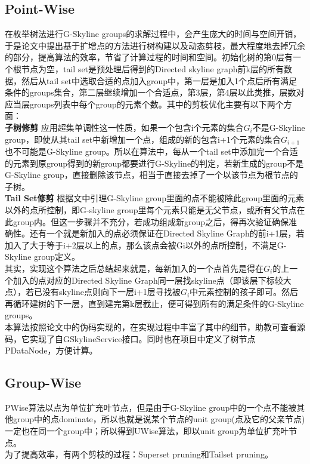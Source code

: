\documentclass{article}
\begin{document}
\begin{CJK}{UTF8}{gbsn}
\subsection{Point-Wise}
在枚举树法进行G-Skyline groups的求解过程中，会产生庞大的时间与空间开销，于是论文中提出基于扩增点的方法进行树构建以及动态剪枝，最大程度地去掉冗余的部分，提高算法的效率，节省了计算过程的时间和空间。初始化树的第0层有一个根节点为空，tail set是预处理后得到的Directed skyline graph前k层的所有数据，然后从tail set中选取合适的点加入group中，第一层是加入1个点后所有满足条件的groups集合，第二层继续增加一个合适点，第3层，第4层以此类推，层数对应当层groups列表中每个group的元素个数。其中的剪枝优化主要有以下两个方面：\\
\textbf{子树修剪}
应用超集单调性这一性质，如果一个包含i个元素的集合$G_{i}$不是G-Skyline group，即使从其tail set中新增加一个点，组成的新的包含i+1个元素的集合$G_{i+1}$也不可能是G-Skyline group。所以在算法中，每从一个tail set中添加完一个合适的元素到原group得到的新group都要进行G-Skyline的判定，若新生成的group不是G-Skyline group，直接删除该节点，相当于直接去掉了一个以该节点为根节点的子树。\\
\textbf{Tail Set修剪}
根据文中引理G-Skyline group里面的点不能被除此group里面的元素以外的点所控制，即G-skyline group里每个元素只能是无父节点，或所有父节点在此group内。但这一步骤并不充分，若成功组成新group之后，得再次验证确保准确性。还有一个就是新加入的点必须保证在Directed Skyline Graph的前i+1层，若加入了大于等于i+2层以上的点，那么该点会被Gi以外的点所控制，不满足G-Skyline group定义。\\
其实，实现这个算法之后总结起来就是，每新加入的一个点首先是得在$G_{i}$的上一个加入的点对应的Directed Skyline Graph同一层找skyline点（即该层下标较大点），若已没有skyline点则向下一层i+1层寻找被$G_{i}$中元素控制的孩子即可。然后再循环建树的下一层，直到建完第k层截止，便可得到所有的满足条件的G-Skyline groups。\\
本算法按照论文中的伪码实现的，在实现过程中丰富了其中的细节，助教可查看源码，它实现了自GSkylineService接口。同时也在项目中定义了树节点PDataNode，方便计算。

\subsection{Group-Wise}
PWise算法以点为单位扩充叶节点，但是由于G-Skyline group中的一个点不能被其他group中的点dominate，所以也就是说某个节点的unit group(点及它的父亲节点)一定也在同一个group中；所以得到UWise算法，即以unit group为单位扩充叶节点。\\
为了提高效率，有两个剪枝的过程：Superset pruning和Tailset pruning。


\end{CJK}
\end{document}
